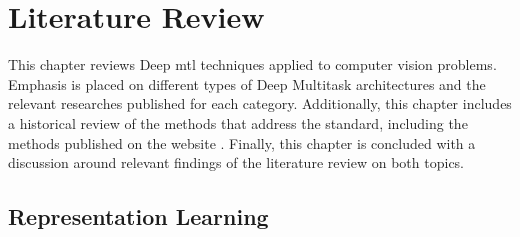 \section{Literature Review} \label{sec:literature}
 
This chapter reviews Deep \acl{mtl} techniques applied to computer vision problems. Emphasis is placed on different types of Deep Multitask architectures and the relevant researches published for each category. Additionally, this chapter includes a historical review of the methods that address the \icao standard, including the methods published on the \fvcongoing website \citep{fvcongoing}. Finally, this chapter is concluded with a discussion around relevant findings of the literature review on both topics.
 
\subsection{Representation Learning}
 
 
 

